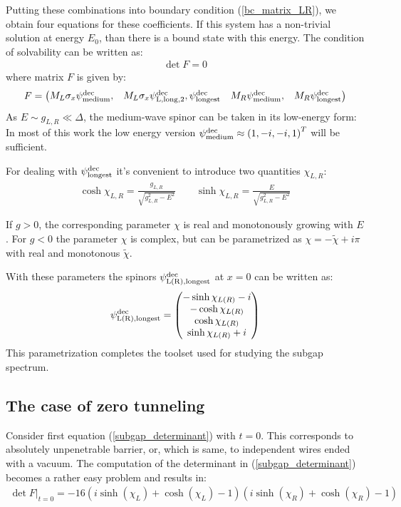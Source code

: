  Putting these combinations into boundary condition (\ref{bc_matrix_LR}), we obtain four equations for these coefficients. If this system has a non-trivial solution at energy $ E_0 $, than there is a bound state with this energy. The condition of solvability can be written as:
\begin{gather}
\label{subgap_determinant}
	\det F = 0
\end{gather}
where matrix $ F $ is given by:
\begin{gather}
F
=
	\begin{pmatrix}
	M_L \sigma_x 
	\wf{dec}{\medium}
	,
	&
	M_L 
	\sigma_x \psi^{\mathrm{dec}}_{\mathrm{L},\mathrm{long,2}},
	\wf{dec}{\verylong}
	&
	M_R
	\wf{dec}{\medium},
	&
	M_R
	\wf{dec}{\verylong}
	\end{pmatrix}
\end{gather}
As $ E\sim g_{L,R}\ll\Delta $, the medium-wave spinor can be taken in its low-energy form: 
In most of this work the low energy version $\wf{dec}{\medium}\approx
\br{
	1,
	- i,
	- i,
	1
}^T
 $
will be sufficient.

For dealing with $ \wf{dec}{\verylong} $ it's convenient to introduce two quantities $ \chi_{L,R} $:
\begin{gather}
\cosh\chi_{L,R}
=
\frac{g_{L,R}}{\sqrt{g^2_{L,R}-E^2}}
\qquad
\sinh\chi_{L,R}
=
\frac{E}{\sqrt{g^2_{L,R}-E^2}}
\end{gather}

If $ g>0 $, the corresponding parameter $ \chi $ is real and monotonously growing with $ E $. For $ g<0 $ the parameter $ \chi $ is complex, but can be parametrized as $ \chi=-\tilde{\chi}+i\pi $ with real and monotonous $\tilde{\chi}  $.

With these parameters the spinors $ \wf{dec}{L\br{R},\verylong} $ at $ x=0 $ can be written as:
\begin{gather}
\wf{dec}{L\br{R},\verylong}
=
	\begin{pmatrix}
	-\sinh \chi_{L\br{R}} -i
	\\
	-\cosh \chi_{L\br{R}}
	\\
	\cosh \chi_{L\br{R}}
	\\
	\sinh \chi_{L\br{R}} +i
	\end{pmatrix}
\end{gather}
This parametrization completes the toolset used for studying the subgap spectrum.

\subsection{The case of zero tunneling}
\label{subsect:zero_tunnel}
Consider first  equation (\ref{subgap_determinant}) with $ t=0 $. This corresponds to absolutely unpenetrable barrier, or, which is same, to independent wires ended with a vacuum. The computation of the determinant in (\ref{subgap_determinant}) becomes a rather easy problem and results in:
\begin{gather}
\label{det_bound_States_zero_t}
	\det F
	\Big|_{t=0}
	=
	-16 \left(i \sinh \left(\chi _L\right)+\cosh \left(\chi _L\right)-1\right) \left(i \sinh \left(\chi _R\right)+\cosh \left(\chi _R\right)-1\right)
\end{gather}

